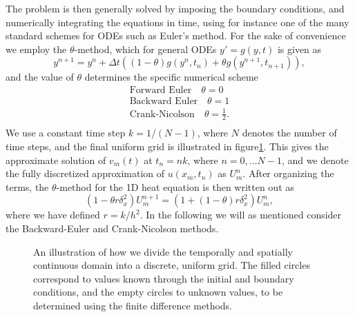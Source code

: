 The problem is then generally solved by imposing the boundary conditions, 
and numerically integrating the equations in time, 
using for instance one of the many standard schemes for ODEs such as Euler's method. 
For the sake of convenience we employ the $\theta$-method, 
which for general ODEs $y' = g(y, t)$ is given as
\begin{equation*}
    y^{n+1} = y^n + \Delta t \left((1-\theta)g(y^n, t_n)+\theta g(y^{n+1}, t_{n+1})\right), 
\end{equation*}
and the value of $\theta$ determines the specific numerical scheme 
\begin{equation*}
\begin{split}
    \text{Forward Euler} \quad \theta = 0 \\
    \text{Backward Euler} \quad \theta = 1 \\
    \text{Crank-Nicolson} \quad \theta = \frac{1}{2}. \\
\end{split}
\end{equation*}
We use a constant time step $k = 1/(N-1)$, 
where $N$ denotes the number of time steps, 
and the final uniform grid is illustrated in figure\ref{fig:2-uniform-grid}. 
This gives the approximate solution of $v_m(t)$ at $t_n = nk$, 
where $n = 0, \ldots N-1$, 
and we denote the fully discretized approximation of $u(x_m, t_n)$ as $U_{m}^{n}$. 
After organizing the terms, 
the $\theta$-method for the 1D heat equation is then written out as
\begin{equation}
    (1 - \theta r \delta_x^2)U_m^{n+1} = \left(1 + (1-\theta)r\delta_x^2\right)U_m^n, 
    \label{eq:theta-heat}
\end{equation}
where we have defined $r=k/h^2$. 
In the following we will as mentioned consider the Backward-Euler and Crank-Nicolson methods. 
\begin{figure}[ht!]
    \centering
    
    \caption{An illustration of how we divide the temporally and spatially continuous domain into a discrete, uniform grid. The filled circles correspond to values known through the initial and boundary conditions, and the empty circles to unknown values, to be determined using the finite difference methods.}
    \label{fig:2-uniform-grid}
\end{figure}


